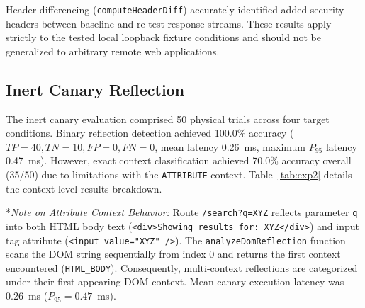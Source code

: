 \documentclass[conference]{IEEEtran}
\begin{document}
Header differencing (\texttt{computeHeaderDiff}) accurately identified added security headers between baseline and re-test response streams. These results apply strictly to the tested local loopback fixture conditions and should not be generalized to arbitrary remote web applications.

\subsection{Inert Canary Reflection}
The inert canary evaluation comprised 50 physical trials across four target conditions. Binary reflection detection achieved 100.0\% accuracy ($TP=40, TN=10, FP=0, FN=0$, mean latency 0.26~ms, maximum $P_{95}$ latency 0.47~ms). However, exact context classification achieved 70.0\% accuracy overall (35/50) due to limitations with the \texttt{ATTRIBUTE} context. Table~\ref{tab:exp2} details the context-level results breakdown.

\begin{table}[t]
\caption{Experiment 2 Inert Canary Reflection \& Context Breakdown}
\label{tab:exp2}
\centering
{}
\end{table}

*\textit{Note on Attribute Context Behavior:} Route \texttt{/search?q=XYZ} reflects parameter \texttt{q} into both HTML body text (\texttt{<div>Showing results for: XYZ</div>}) and input tag attribute (\texttt{<input value="XYZ" />}). The \texttt{analyzeDomReflection} function scans the DOM string sequentially from index 0 and returns the first context encountered (\texttt{HTML\_BODY}). Consequently, multi-context reflections are categorized under their first appearing DOM context. Mean canary execution latency was 0.26~ms ($P_{95} = 0.47$~ms).
\end{document}

